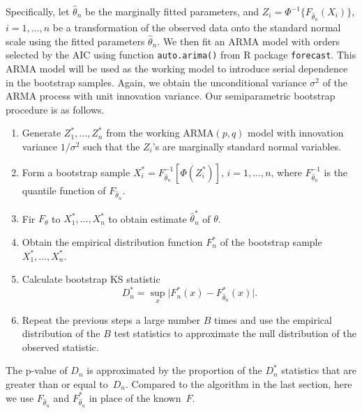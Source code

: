 \documentclass[12pt, letterpaper, titlepage]{article}
\begin{document}
Specifically, let $\hat\theta_n$ be the marginally fitted parameters, and
$Z_i = \Phi^{-1} \{F_{\hat\theta_n}(X_i)\}$, $i = 1, \ldots, n$ be a
transformation of the observed data onto the standard normal scale using the
fitted parameters $\hat\theta_n$. We then fit an ARMA model with orders
selected by the AIC using function \texttt{auto.arima()} from R package
\texttt{forecast}. This ARMA model will be used as the working model to
introduce serial dependence in the bootstrap samples. Again, we obtain the
unconditional variance $\sigma^2$ of the ARMA process with unit innovation
variance. Our semiparametric bootstrap procedure is as follows.

\begin{enumerate}
\item
  Generate $Z_1^*, \ldots, Z_n^*$ from the working ARMA$(p, q)$ model with
  innovation variance $1 / \sigma^2$ such that the $Z_i$'s are marginally
  standard normal variables.
\item
  Form a bootstrap sample
  $X_i^* = F_{\hat\theta_n}^{-1} [\Phi(Z_i^*)]$, $i = 1, \ldots, n$, where
  $F_{\hat\theta_n}^{-1}$ is the quantile function of $F_{\hat\theta_n}$.
\item
  Fir $F_\theta$ to $X_1^*, \ldots, X_n^*$ to obtain estimate $\hat\theta_n^*$
  of $\theta$.
\item
  Obtain the empirical distribution function $F_n^*$ of the bootstrap sample
  $X_1^*, \ldots, X_n^*$.
\item
  Calculate bootstrap KS statistic
  \[
    D_n^* = \sup_x \lvert F_n^* (x) - F_{\hat\theta_n}^* (x) \rvert.
  \]
\item
  Repeat the previous steps a large number $B$ times and use the empirical
  distribution of the $B$ test statistics to approximate
  the null distribution of the observed statistic.
\end{enumerate}
The p-value of $D_n$ is approximated by the proportion of the $D_n^*$
statistics that are greater than or equal to~$D_n$. Compared to the algorithm in
the last section, here we use $F_{\hat\theta_n}$ and $F_{\hat\theta_n}^*$ in
place of the known~$F$.
\end{document}
